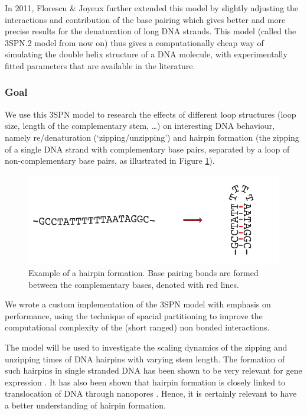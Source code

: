 In 2011, Florescu \& Joyeux \cite{florescu2011thermal} further extended this model by slightly adjusting the interactions and contribution of the base pairing which gives better and more precise results for the denaturation of long DNA strands. This model (called the 3SPN.2 model from now on) thus gives a computationally cheap way of simulating the double helix structure of a DNA molecule, with experimentally fitted parameters that are available in the literature.



\subsubsection*{Goal}

We use this 3SPN model to research the effects of different loop structures (loop size, length of the complementary stem, \ldots) on interesting DNA behaviour, namely re/denaturation (`zipping/unzipping') and hairpin formation (the zipping of a single DNA strand with complementary base pairs, separated by a loop of non-complementary base pairs, as illustrated in Figure \ref{hairpin_example}).
\begin{figure}[h]
\includegraphics{images/hairpin_example}
\caption{Example of a hairpin formation. Base pairing bonds are formed between the complementary bases, denoted with red lines.}\label{hairpin_example}
\end{figure}
We wrote a custom implementation of the 3SPN model with emphasis on performance, using the technique of spacial partitioning \cite{plimpton1995fast} to improve the computational complexity of the (short ranged) non bonded interactions.

The model will be used to investigate the scaling dynamics of the zipping and unzipping times of DNA hairpins with varying stem length. The formation of such hairpins in single stranded DNA has been shown to be very relevant for gene expression \cite{oettinger2000hairpins}. It has also been shown that hairpin formation is closely linked to translocation of DNA through nanopores \cite{carlon2011anomalous}. Hence, it is certainly relevant to have a better understanding of hairpin formation.

